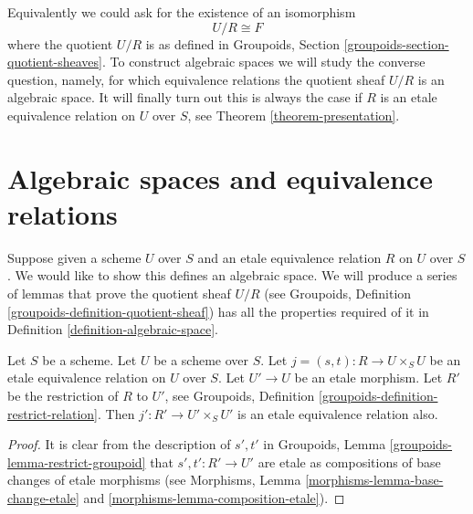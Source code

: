 \noindent
Equivalently we could ask for the existence of an isomorphism
$$
U/R \cong F
$$
where the quotient $U/R$ is as defined in
Groupoids, Section \ref{groupoids-section-quotient-sheaves}.
To construct algebraic spaces we will study the converse question, namely,
for which equivalence relations the quotient sheaf $U/R$ is an algebraic space.
It will finally turn out this is always the case if $R$ is an etale equivalence
relation on $U$ over $S$, see Theorem \ref{theorem-presentation}. 





























\section{Algebraic spaces and equivalence relations}
\label{section-spaces-from-equivalence-relations}

\noindent
Suppose given a scheme $U$ over $S$
and an etale equivalence relation $R$ on $U$ over $S$.
We would like to show this defines an algebraic space.
We will produce a series of lemmas that prove the quotient sheaf $U/R$
(see Groupoids, Definition \ref{groupoids-definition-quotient-sheaf})
has all the properties required
of it in Definition \ref{definition-algebraic-space}.

\begin{lemma}
\label{lemma-pullback-etale-equivalence-relation}
Let $S$ be a scheme. Let $U$ be a scheme over $S$.
Let $j = (s, t) : R \to U \times_S U$
be an etale equivalence relation on $U$ over $S$.
Let $U' \to U$ be an etale morphism.
Let $R'$ be the restriction of $R$ to $U'$, see
Groupoids, Definition \ref{groupoids-definition-restrict-relation}.
Then $j' : R' \to U' \times_S U'$ is an etale equivalence
relation also.
\end{lemma}

\begin{proof}
It is clear from the description of $s', t'$ in
Groupoids, Lemma \ref{groupoids-lemma-restrict-groupoid}
that $s' , t' : R' \to U'$ are etale
as compositions of base changes of etale morphisms
(see Morphisms, Lemma \ref{morphisms-lemma-base-change-etale}
and \ref{morphisms-lemma-composition-etale}).
\end{proof}

